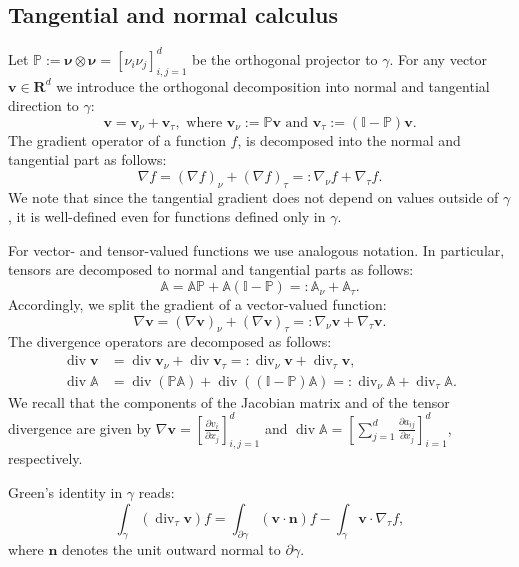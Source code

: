 \documentclass[a4paper]{article}
\numberwithin{equation}{section}
\def\div{\operatorname{div}}
\def\nn{\vc n}
\def\nnu{\boldsymbol\nu}
\def\prtl{\partial}
\def\Real{{\mathbf R}} %
\def\tn#1{{\mathbb{#1}}}    %
\def\vc#1{\mathbf{#1}}     %
\def\vv{\vc v}
\newcommand{\eqs}[1]{\begin{equation*}#1\end{equation*}}
\begin{document}
\subsection{Tangential and normal calculus}
Let $\tn P := \nnu\otimes\nnu = [\nu_i\nu_j]_{i,j=1}^d$ be the orthogonal projector to $\gamma$.
For any vector $\vv\in\Real^d$ we introduce the orthogonal decomposition into normal and tangential direction to $\gamma$:
\eqs{ \vv = \vv_\nu + \vv_\tau, \mbox{ where } \vv_\nu := \tn P\vv \mbox{ and } \vv_\tau := (\tn I-\tn P)\vv. }
The gradient operator of a function $f$, is decomposed into the normal and tangential part as follows:
\eqs{ \nabla f = (\nabla f)_\nu + (\nabla f)_\tau =: \nabla_\nu f + \nabla_\tau f. }
We note that since the tangential gradient does not depend on values outside of $\gamma$, it is well-defined even for functions defined only in $\gamma$.

For vector- and tensor-valued functions we use analogous notation.
In particular, tensors are decomposed to normal and tangential parts as follows:
\eqs{ \tn A = \tn A\tn P + \tn A(\tn I-\tn P) =: \tn A_\nu + \tn A_\tau. }
Accordingly, we split the gradient of a vector-valued function:
\eqs{ \nabla\vv = (\nabla\vv)_\nu + (\nabla\vv)_\tau =: \nabla_\nu\vv + \nabla_\tau\vv. }
The divergence operators are decomposed as follows:
\begin{align*}
\div\vv &= \div\vv_\nu + \div\vv_\tau =: \div_\nu\vv + \div_\tau\vv,\\
\div\tn A &= \div(\tn P\tn A) + \div((\tn I-\tn P)\tn A) =: \div_\nu\tn A + \div_\tau\tn A.
\end{align*}
We recall that the components of the Jacobian matrix and of the tensor divergence are given by $\nabla\vv=\left[\tfrac{\prtl v_i}{\prtl x_j}\right]_{i,j=1}^d$ and $\div\tn A = \left[\sum_{j=1}^d\tfrac{\prtl a_{ij}}{\prtl x_j}\right]_{i=1}^d$, respectively.

Green's identity in $\gamma$ reads:
\eqs{ \int_\gamma(\div_\tau\vv)f = \int_{\prtl\gamma}(\vv\cdot\nn)f - \int_\gamma\vv\cdot\nabla_\tau f, }
where $\nn$ denotes the unit outward normal to $\partial\gamma$.
\end{document}
